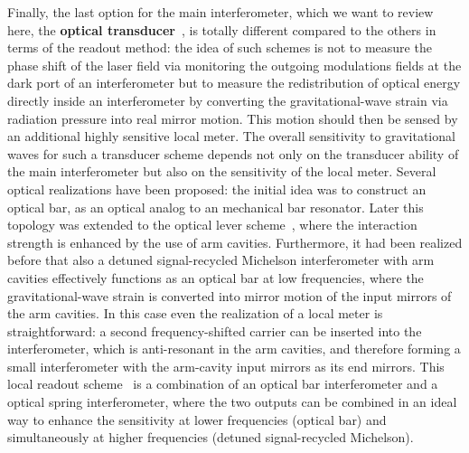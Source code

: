Finally, the last option for the main interferometer, which we
want to review here, the {\bf optical
transducer}~\cite{Braginsky1996,Braginsky1997,Khalili2002a,Rehbein2007},
is totally different compared to the others in terms of the
readout method: the idea of such schemes is not to measure the
phase shift of the laser field via monitoring the outgoing
modulations fields at the dark port of an interferometer but to
measure the redistribution of optical energy directly inside an
interferometer by converting the gravitational-wave strain via
radiation pressure into real mirror motion. This motion should
then be sensed by an additional highly sensitive local meter. The
overall sensitivity to gravitational waves for such a transducer
scheme depends not only on the transducer ability of the main
interferometer but also on the sensitivity of the local meter.
Several optical realizations have been proposed: the initial idea
was to construct an optical bar, as an optical analog to an
mechanical bar resonator. Later this topology was extended to the
optical lever scheme~\cite{Khalili2002a}, where the interaction
strength is enhanced by the use of arm cavities. Furthermore, it
had been realized before that also a detuned signal-recycled
Michelson interferometer with arm cavities effectively functions
as an optical bar at low frequencies, where the gravitational-wave
strain is converted into mirror motion of the input mirrors of the
arm cavities. In this case even the realization of a local meter
is straightforward: a second frequency-shifted carrier can be
inserted into the interferometer, which is anti-resonant in the
arm cavities, and therefore forming a small interferometer with
the arm-cavity input mirrors as its end mirrors. This local
readout scheme~\cite{Rehbein2007} is a combination of an optical
bar interferometer and a optical spring interferometer, where the
two outputs can be combined in an ideal way to enhance the
sensitivity at lower frequencies (optical bar) and simultaneously
at higher frequencies (detuned signal-recycled Michelson).

